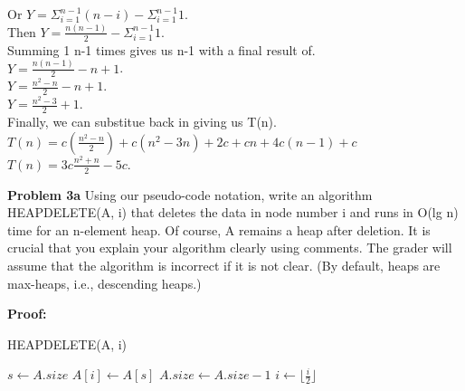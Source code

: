 \documentclass[12pt]{article}
\begin{document}
Or $Y = \Sigma^{n - 1}_{i = 1} (n - i) - \Sigma^{n - 1}_{i = 1} 1$.\\
Then $Y = \frac{n(n - 1)}{2} - \Sigma^{n - 1}_{i = 1} 1$.\\
Summing 1 n-1 times gives us n-1 with a final result of.\\
$Y = \frac{n(n - 1)}{2} - n + 1$.\\
$Y = \frac{n^{2} - n}{2} - n + 1$.\\
$Y = \frac{n^{2} - 3}{2} + 1$.\\
Finally, we can substitue back in giving us T(n).\\
$T(n) = c(\frac{n^{2} - n}{2}) + c(n^{2} - 3n) + 2c + cn + 4c(n - 1) + c$
$T(n) = 3c\frac{n^{2} + n}{2} - 5c$.\\


\rightline{$\blacksquare$}

\par

\par
\bigskip
{\bf Problem
    3a
}
Using our pseudo-code notation, write an algorithm HEAPDELETE(A, i) that
deletes the data in node number i and runs in O(lg n) time for an n-element
heap. Of course, A remains a heap after deletion.
It is crucial that you explain your algorithm clearly using comments. The grader
will assume that the algorithm is incorrect if it is not clear.
(By default, heaps are max-heaps, i.e., descending heaps.)

\par
\bigskip
{\bf Proof:}
\par
HEAPDELETE(A, i)
\begin{algorithmic}
    \State $s \gets A.size$
    \State $A[i] \gets A[s]$ 
    \State $A.size \gets A.size - 1$ 
     
         
        \State $i \gets \lfloor\frac{i}{2}\rfloor$ 
\end{algorithmic}
\end{document}
